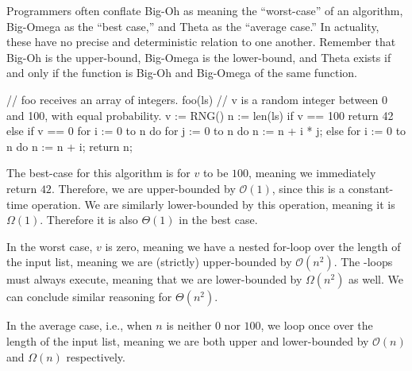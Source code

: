 Programmers often conflate Big-Oh as meaning the ``worst-case'' of an algorithm, Big-Omega as the ``best case,'' and Theta as the ``average case.'' In actuality, these have no precise and deterministic relation to one another. Remember that Big-Oh is the upper-bound, Big-Omega is the lower-bound, and Theta exists if and only if the function is Big-Oh and Big-Omega of the same function.

\begin{verbnobox}[\small]
// foo receives an array of integers.
foo(ls) {
  // v is a random integer between 0 and 100, with equal probability.
  v := RNG()
  n := len(ls)
  if v == 100
    return 42
  else if v == 0
    for i := 0 to n do
      for j := 0 to n do
        n := n + i * j;
  else
    for i := 0 to n do
      n := n + i;
  return n;
}
\end{verbnobox}

The best-case for this algorithm is for $v$ to be $100$, meaning we immediately return $42$. Therefore, we are upper-bounded by $\mathcal{O}(1)$, since this is a constant-time operation. We are similarly lower-bounded by this operation, meaning it is $\Omega{(1)}$. Therefore it is also $\Theta(1)$ in the best case.

In the worst case, $v$ is zero, meaning we have a nested for-loop over the length of the input list, meaning we are (strictly) upper-bounded by $\mathcal{O}(n^2)$. The -loops must always execute, meaning that we are lower-bounded by $\Omega(n^2)$ as well. We can conclude similar reasoning for $\Theta(n^2)$.

In the average case, i.e., when $n$ is neither $0$ nor $100$, we loop once over the length of the input list, meaning we are both upper and lower-bounded by $\mathcal{O}(n)$ and $\Omega(n)$ respectively.


